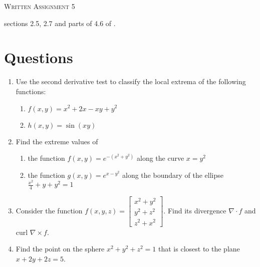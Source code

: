 \documentclass{article}
\date{}
\begin{document}
\begin{center}
\textsc{\LARGE Written Assignment 5}\\[0.5cm]
\end{center}
\From sections 2.5, 2.7 and parts of 4.6 of \VCT.

\section*{Questions}

\begin{enumerate}

\item

Use the second derivative test to classify the local extrema of the
following functions:
\begin{enumerate}
 \item $f(x,y) = x^2 + 2x - xy + y^2$
 \item $h(x,y) = \sin(xy)$
\end{enumerate}

\item

Find the extreme values of
\begin{enumerate}
 \item the function
  $f(x,y) = e^{-(x^2+y^2)}$
  along the curve $x = y^2$
 \item the function
  $g(x,y) = e^{x-y^2}$ along the boundary of the ellipse
  $\frac{x^2}{4}+y+y^2=1$
\end{enumerate}

\item

Consider the function $f(x,y,z) = \begin{bmatrix}
                                   x^2 + y^2 \\
                                   y^2 + z^2 \\
                                   z^2 + x^2
                                  \end{bmatrix}$.
Find its divergence $\nabla \cdot f$ and curl $\nabla \times f$.

\item

Find the point on the sphere $x^2 + y^2 + z^2 = 1$ that is closest
to the plane $x + 2y + 2z = 5$.


\end{enumerate}
\end{document}
